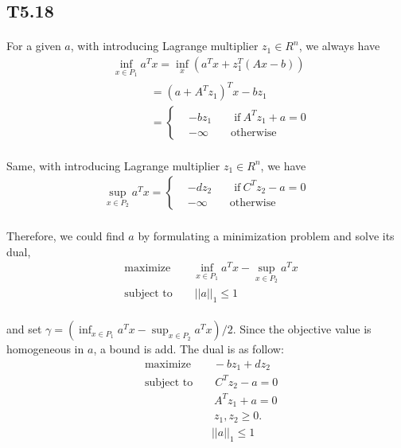 \subsection*{T5.18}
\paragraph{}
For a given $a$, with introducing Lagrange multiplier $z_1 \in R^n$, we always have 
\begin{align*}
&\inf_{x\in P_1} a^Tx = \inf_x(a^Tx +z_1^T(Ax-b))\\
&\qquad \quad \ \ =(a+A^Tz_1)^Tx-bz_1 \\
&\qquad \quad \ \ =\begin{cases}
& -bz_1 \qquad \text{if}\ A^Tz_1+a=0\\
& -\infty \qquad \text{otherwise}
\end{cases}
\end{align*}
\paragraph{}
Same, with introducing Lagrange multiplier $z_1 \in R^n$, we have
\begin{align*}
\sup_{x\in P_2} a^Tx=\begin{cases}
& -dz_2 \qquad \text{if}\ C^Tz_2-a=0\\
& -\infty \qquad \text{otherwise}
\end{cases}
\end{align*}
\paragraph{}
Therefore, we could find $a$ by formulating a minimization problem and solve its dual,
\begin{align*}
&\text{maximize} \qquad \inf_{x\in P_1} a^Tx - \sup_{x\in P_2} a^Tx\\
&\text{subject to}\qquad ||a||_1 \leq 1
\end{align*}
\paragraph{}
and set $\gamma = (\inf_{x\in P_1} a^Tx - \sup_{x\in P_2} a^Tx)/2$. Since the objective value is homogeneous in $a$, a bound is add. The dual is as follow:
\begin{align*}
&\text{maximize} \qquad -bz_1 + dz_2\\
&\text{subject to}\qquad C^Tz_2-a=0\\
&\qquad \qquad \qquad \ A^Tz_1+a=0\\
&\qquad \qquad \qquad \ z_1, z_2 \geq 0.\\
&\qquad \qquad \qquad||a||_1 \leq 1
\end{align*}